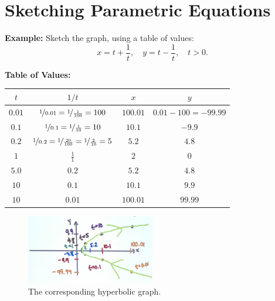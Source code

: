 \documentclass{article}
\begin{document}
\section*{Sketching Parametric Equations}
\begin{examplebox}
\textbf{Example:} Sketch the graph, using a table of values:
\[ x = t + \frac{1}{t}, \quad y = t - \frac{1}{t}, \quad t > 0. \]
\begin{solutionbox}
    \textbf{Table of Values:}
\begin{center}
\begin{adjustbox}{max width=\textwidth, max height=\textheight}
\large
\begin{tabular}{|c|c|c|c|}
\hline
$t$    & $1/t$ & $x$ & $y$ \\ \hline
$0.01$ & $\nicefrac{1}{0.01} = \nicefrac{1}{\frac{1}{100}} = 100$     & $100.01$   & $0.01 - 100 = -99.99$   \\ \hline
$0.1$  & $\nicefrac{1}{0.1} = \nicefrac{1}{\frac{1}{10}} = 10$     & $10.1$   & $-9.9$   \\ \hline
$0.2$  & $\nicefrac{1}{0.2} = \nicefrac{1}{\frac{20}{100}} = \nicefrac{1}{\frac{2}{10}} = 5$     & $5.2$   & $4.8$   \\ \hline
$1$    & $\frac{1}{1}$     & $2$   & $0$   \\ \hline
$5.0$  & $0.2$     & $5.2$   & $4.8$   \\ \hline
$10$   & $0.1$     & $10.1$   & $9.9$   \\ \hline
$10$   & $0.01$    & $100.01$   & $99.99$   \\ \hline
\end{tabular}
\normalsize
\end{adjustbox}
\end{center}
\begin{figure}[H]
    \centering
    \includegraphics[width=0.5\textwidth]{hyperbola.jpg}
    \caption{The corresponding hyperbolic graph.}
    \label{fig:sample_image}
\end{figure}
\end{solutionbox}
\end{examplebox}
\end{document}
